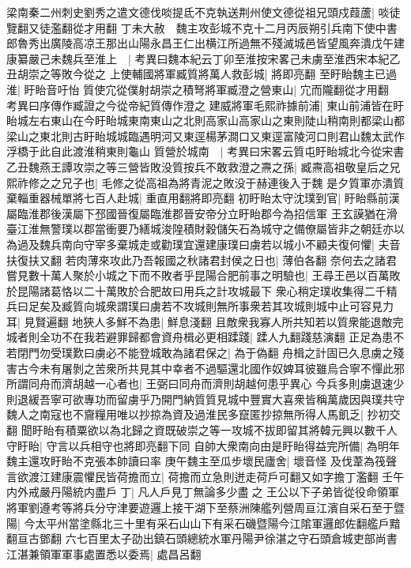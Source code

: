 梁南秦二州刺史劉秀之遣文德伐啖提氐不克執送荆州使文德從祖兄頭戍葭蘆|{
	啖徒覽翻又徒濫翻從才用翻}
丁未大赦　魏主攻彭城不克十二月丙辰朔引兵南下使中書郎魯秀出廣陵高凉王那出山陽永昌王仁出横江所過無不殘滅城邑皆望風奔潰戊午建康纂嚴己未魏兵至淮上　|{
	考異曰魏本紀云丁卯至淮按宋畧己未虜至淮西宋本紀乙丑胡崇之等敗今從之}
上使輔國將軍臧質將萬人救彭城|{
	將即亮翻}
至盱眙魏主已過淮|{
	盱眙音吁怡}
質使宂從僕射胡崇之積弩將軍臧澄之營東山|{
	宂而隴翻從才用翻　考異曰序傳作臧證之今從帝紀質傳作澄之}
建威將軍毛熙祚據前浦|{
	東山前浦皆在盱眙城左右東山在今盱眙城東南東山之北則高家山高家山之東則陡山稍南則都梁山都梁山之東北則古盱眙城城臨遇明河又東逕楊茅澗口又東逕富陵河口則君山魏太武作浮橋于此自此渡淮稍東則龜山}
質營於城南　|{
	考異曰宋畧云質屯盱眙城北今從宋書}
乙丑魏燕王譚攻崇之等三營皆敗没質按兵不敢救澄之燾之孫|{
	臧燾高祖敬皇后之兄}
熙祚修之之兄子也|{
	毛修之從高祖為將青泥之敗没于赫連後入于魏}
是夕質軍亦潰質棄輜重器械單將七百人赴城|{
	重直用翻將即亮翻}
初盱眙太守沈璞到官|{
	盱眙縣前漢屬臨淮郡後漢屬下邳國晉復屬臨淮郡晉安帝分立盱眙郡今為招信軍}
王玄謨猶在滑臺江淮無警璞以郡當衝要乃繕城浚隍積財穀儲矢石為城守之備僚屬皆非之朝廷亦以為過及魏兵南向守宰多棄城走或勸璞宜還建康璞曰虜若以城小不顧夫復何懼|{
	夫音扶復扶又翻}
若肉薄來攻此乃吾報國之秋諸君封侯之日也|{
	薄伯各翻}
奈何去之諸君嘗見數十萬人聚於小城之下而不敗者乎昆陽合肥前事之明驗也|{
	王尋王邑以百萬敗於昆陽諸葛恪以二十萬敗於合肥故曰用兵之計攻城最下}
衆心稍定璞收集得二千精兵曰足矣及臧質向城衆謂璞曰虜若不攻城則無所事衆若其攻城則城中止可容見力耳|{
	見賢遍翻}
地狹人多鮮不為患|{
	鮮息淺翻}
且敵衆我寡人所共知若以質衆能退敵完城者則全功不在我若避罪歸都會資舟楫必更相蹂踐|{
	蹂人九翻踐慈演翻}
正足為患不若閉門勿受璞歎曰虜必不能登城敢為諸君保之|{
	為于偽翻}
舟楫之計固已久息虜之殘害古今未有屠剝之苦衆所共見其中幸者不過驅還北國作奴婢耳彼雖烏合寧不憚此邪所謂同舟而濟胡越一心者也|{
	王弼曰同舟而濟則胡越何患乎異心}
今兵多則虜退速少則退緩吾寧可欲專功而留虜乎乃開門納質質見城中豐實大喜衆皆稱萬歲因與璞共守魏人之南寇也不齎糧用唯以抄掠為資及過淮民多竄匿抄掠無所得人馬飢乏|{
	抄初交翻}
聞盱眙有積粟欲以為北歸之資既破崇之等一攻城不拔即留其將韓元興以數千人守盱眙|{
	守言以兵相守也將即亮翻下同}
自帥大衆南向由是盱眙得益完所備|{
	為明年魏主還攻盱眙不克張本帥讀曰率}
庚午魏主至瓜步壞民廬舍|{
	壞音怪}
及伐葦為筏聲言欲渡江建康震懼民皆荷擔而立|{
	荷擔而立急則迸走荷戶可翻又如字擔丁濫翻}
壬午内外戒嚴丹陽統内盡戶丁|{
	凡人戶見丁無論多少盡之}
王公以下子弟皆從役命領軍將軍劉遵考等將兵分守津要遊邏上接干湖下至蔡洲陳艦列營周亘江濱自采石至于暨陽|{
	今太平州當塗縣北三十里有采石山山下有采石磯暨陽今江隂軍邏郎佐翻艦戶黯翻亘古鄧翻}
六七百里太子劭出鎮石頭總統水軍丹陽尹徐湛之守石頭倉城吏部尚書江湛兼領軍軍事處置悉以委焉|{
	處昌呂翻}
